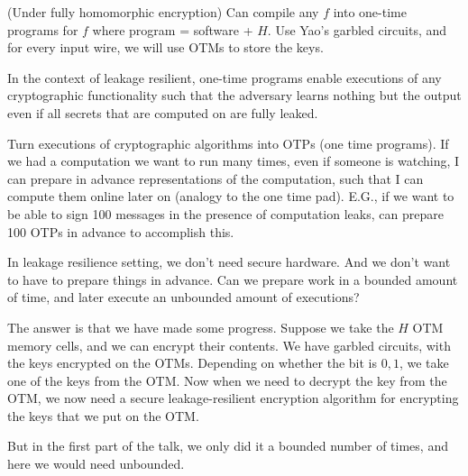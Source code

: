 \documentclass[10pt]{article}
\begin{document}
\begin{theorem}
(Under fully homomorphic encryption) Can compile any $f$ into one-time programs for $f$ where program = software + $H$. Use Yao's garbled circuits, and for every input wire, we will use OTMs to store the keys.
\end{theorem}

In the context of leakage resilient, one-time programs enable executions of any cryptographic functionality such that the adversary learns nothing but the output even if all secrets that are computed on are fully leaked.

Turn executions of cryptographic algorithms into OTPs (one time programs). If we had a computation we want to run many times, even if someone is watching, I can prepare in advance representations of the computation, such that I can compute them online later on (analogy to the one time pad). E.G., if we want to be able to sign 100 messages in the presence of computation leaks, can prepare 100 OTPs in advance to accomplish this.

In leakage resilience setting, we don't need secure hardware. And we don't want to have to prepare things in advance. Can we prepare work in a bounded amount of time, and later execute an unbounded amount of executions?

The answer is that we have made some progress. Suppose we take the $H$ OTM memory cells, and we can encrypt their contents. We have garbled circuits, with the keys encrypted on the OTMs. Depending on whether the bit is $0, 1$, we take one of the keys from the OTM. Now when we need to decrypt the key from the OTM, we now need a secure leakage-resilient encryption algorithm for encrypting the keys that we put on the OTM.

But in the first part of the talk, we only did it a bounded number of times, and here we would need unbounded.


\nocite{*}


\end{document}

